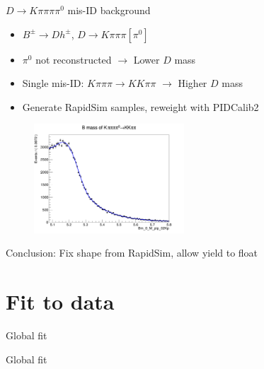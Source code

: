 \documentclass{beamer}
\begin{document}
\begin{frame}{$D\to K\pi\pi\pi\pi^0$ mis-ID background}
  \begin{itemize}
    \setlength\itemsep{0.5em}
    \item{$B^\pm\to Dh^\pm$, $D\to K\pi\pi\pi[\pi^0]$}
    \item{$\pi^0$ not reconstructed $\to$ Lower $D$ mass}
    \item{Single mis-ID: $K\pi\pi\pi\to KK\pi\pi$ $\to$ Higher $D$ mass}
    \item{Generate RapidSim samples, reweight with PIDCalib2}
  \end{itemize}
  \begin{figure}
    \includegraphics[width = 0.5\textwidth]{Plots/Kpipipipi0BMassB2DpiD2Kpipipi.png}
  \end{figure}
  \begin{center}
    Conclusion: Fix shape from RapidSim, allow yield to float
  \end{center}
\end{frame}

\section{Fit to data}
\begin{frame}{Global fit}
  \begin{center}
    {\huge Global fit}
  \end{center}
\end{frame}
\end{document}

